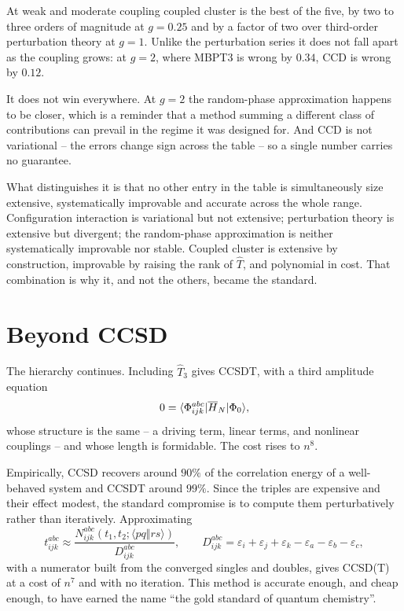At weak and moderate coupling coupled cluster is the best of the five, by two
to three orders of magnitude at $g=0.25$ and by a factor of two over
third-order perturbation theory at $g=1$.  Unlike the perturbation series it
does not fall apart as the coupling grows: at $g=2$, where MBPT3 is wrong by
$0.34$, CCD is wrong by $0.12$.

It does not win everywhere.  At $g=2$ the random-phase approximation happens
to be closer, which is a reminder that a method summing a different class of
contributions can prevail in the regime it was designed for.  And CCD is not
variational -- the errors change sign across the table -- so a single number
carries no guarantee.

What distinguishes it is that no other entry in the table is simultaneously
size extensive, systematically improvable and accurate across the whole
range.  Configuration interaction is variational but not extensive;
perturbation theory is extensive but divergent; the random-phase
approximation is neither systematically improvable nor stable.  Coupled
cluster is extensive by construction, improvable by raising the rank of
$\hat{T}$, and polynomial in cost.  That combination is why it, and not the
others, became the standard.

\section{Beyond CCSD}
\label{sec:beyondccsd}

The hierarchy continues.  Including $\hat{T}_3$ gives CCSDT, with a third
amplitude equation
\begin{equation}
  0 = \langle \Phi_{ijk}^{abc} | \overline{H}_N | \Phi_0 \rangle,
  \label{eq:10-triples}
\end{equation}
whose structure is the same -- a driving term, linear terms, and nonlinear
couplings -- and whose length is formidable.  The cost rises to $n^8$.

Empirically, CCSD recovers around $90\%$ of the correlation energy of a
well-behaved system and CCSDT around $99\%$.  Since the triples are expensive
and their effect modest, the standard compromise is to compute them
perturbatively rather than iteratively.  Approximating
\begin{equation}
  t_{ijk}^{abc} \approx
    \frac{N_{ijk}^{abc}\!\left(t_1,t_2;\langle pq\Vert rs\rangle\right)}
         {D_{ijk}^{abc}},
  \qquad
  D_{ijk}^{abc} = \varepsilon_i+\varepsilon_j+\varepsilon_k
    -\varepsilon_a-\varepsilon_b-\varepsilon_c,
  \label{eq:10-perturbativetriples}
\end{equation}
with a numerator built from the converged singles and doubles, gives
CCSD(T) at a cost of $n^7$ and with no iteration.  This method is accurate
enough, and cheap enough, to have earned the name ``the gold standard of
quantum chemistry''.

